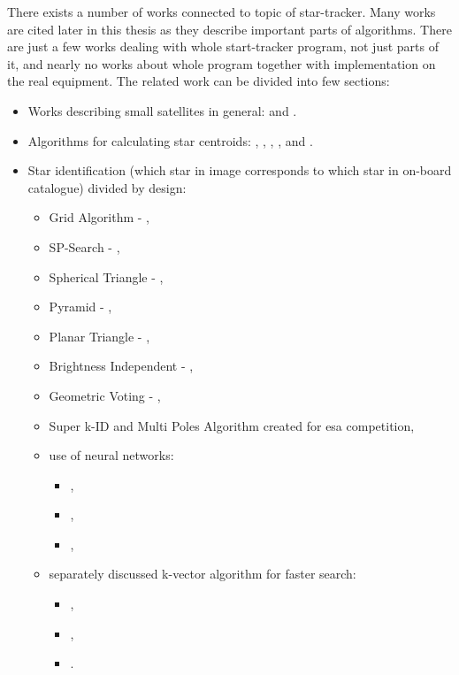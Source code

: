 \documentclass[12pt,a4paper,twoside]{article}
\begin{document}
There exists a number of works connected to topic of star-tracker. Many works are cited later in this thesis as they describe important parts of algorithms. There are just a few works dealing with whole start-tracker program, not just parts of it, and nearly no works about whole program together with implementation on the real equipment. The related work can be divided into few sections:

\begin{itemize}[noitemsep]
\item Works describing small satellites in general: \citet{heidt2000cubesat} and \citet{swartwout2011brief}.

\item Algorithms for calculating star centroids: \citet{liebe2002accuracy}, \citet{samaan2002predictive}, \citet{knutson2012fast}, \citet{azizabadi2014vlsi}, \citet{lindh2014development} and \citet{zhang2014brightness}. 

\item Star identification (which star in image corresponds to which star in on-board catalogue) divided by design:
\begin{itemize}[noitemsep]
\item Grid Algorithm - \citet{padgett1997grid}, 
\item SP-Search - \citet{mortari1999sp},
\item Spherical Triangle - \citet{cole2004fast}, 
\item Pyramid - \citet{mortari2004pyramid}, 
\item Planar Triangle - \citet{cole2006fast}, 
\item Brightness Independent - \citet{dong2006brightness},
\item Geometric Voting - \citet{kolomenkin2008geometric}, 
\item Super k-ID and Multi Poles Algorithm created for \gls{esa} competition\cite{esa-competition},
\item use of neural networks: 
\begin{itemize}[noitemsep]
\item \citet{lindbladstar},
\item \citet{li2003star}, 
\item \citet{miri2012star}, 
\end{itemize}
\item separately discussed k-vector algorithm for faster search:
\begin{itemize}[noitemsep]
\item \citet{mortari1996fast}, 
\item \citet{mortari2000k},
\item \citet{mortari2013k}. 
\end{itemize}
\end{itemize}


\end{itemize}
\end{document}
